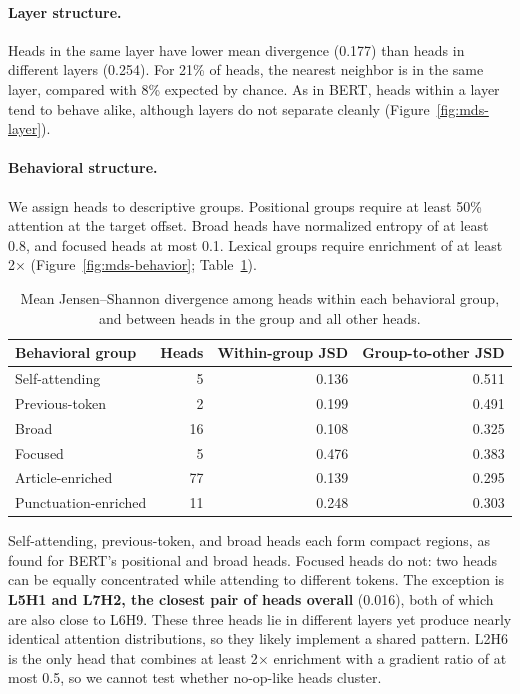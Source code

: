 \documentclass{article}
\begin{document}
\paragraph{Layer structure.} Heads in the same layer have lower mean divergence (0.177) than heads in different layers (0.254). For 21\% of heads, the nearest neighbor is in the same layer, compared with 8\% expected by chance. As in BERT, heads within a layer tend to behave alike, although layers do not separate cleanly (Figure~\ref{fig:mds-layer}).

\paragraph{Behavioral structure.} We assign heads to descriptive groups. Positional groups require at least 50\% attention at the target offset. Broad heads have normalized entropy of at least 0.8, and focused heads at most 0.1. Lexical groups require enrichment of at least 2$\times$ (Figure~\ref{fig:mds-behavior}; Table~\ref{tab:groups}).

\begin{table}[htbp]
  \caption{Mean Jensen--Shannon divergence among heads within each behavioral group, and between heads in the group and all other heads.}
  \label{tab:groups}
  \centering
  \begin{tabular}{lrrr}
    \toprule
    Behavioral group     & Heads & Within-group JSD & Group-to-other JSD \\
    \midrule
    Self-attending       & 5     & 0.136 & 0.511 \\
    Previous-token       & 2     & 0.199 & 0.491 \\
    Broad                & 16    & 0.108 & 0.325 \\
    Focused              & 5     & 0.476 & 0.383 \\
    Article-enriched     & 77    & 0.139 & 0.295 \\
    Punctuation-enriched & 11    & 0.248 & 0.303 \\
    \bottomrule
  \end{tabular}
\end{table}

Self-attending, previous-token, and broad heads each form compact regions, as \citeauthor{clark2019} found for BERT's positional and broad heads. Focused heads do not: two heads can be equally concentrated while attending to different tokens. The exception is \textbf{L5H1 and L7H2, the closest pair of heads overall} (0.016), both of which are also close to L6H9. These three heads lie in different layers yet produce nearly identical attention distributions, so they likely implement a shared pattern. L2H6 is the only head that combines at least 2$\times$ enrichment with a gradient ratio of at most 0.5, so we cannot test whether no-op-like heads cluster.
\end{document}
